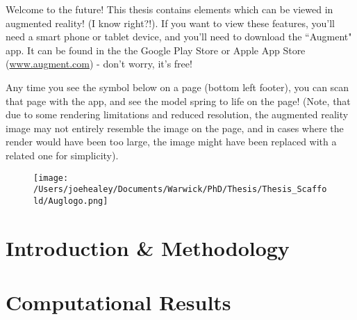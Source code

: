\documentclass[a4paper, oneside, 11pt]{report} %
\begin{document}
Welcome to the future! This thesis contains elements which can be viewed in augmented reality! (I know right?!). If you want to view these features, you'll need a smart phone or tablet device, and you'll need to download the ``Augment" app. It can be found in the the Google Play Store or Apple App Store (\url{www.augment.com}) - don't worry, it's free!

Any time you see the symbol below on a page (bottom left footer), you can scan that page with the app, and see the model spring to life on the page! (Note, that due to some rendering limitations and reduced resolution, the augmented reality image may not entirely resemble the image on the page, and in cases where the render would have been too large, the image might have been replaced with a related one for simplicity).

\vspace{1cm}
\begin{figure}[h!]
\centering
    \texttt{[image: /Users/joehealey/Documents/Warwick/PhD/Thesis/Thesis\_Scaffold/Auglogo.png]}
\end{figure}

\newpage


\setcounter{page}{1}
\part{Introduction \& Methodology}

\newpage


\newpage

\part{Computational Results}

\newpage
\end{document}

